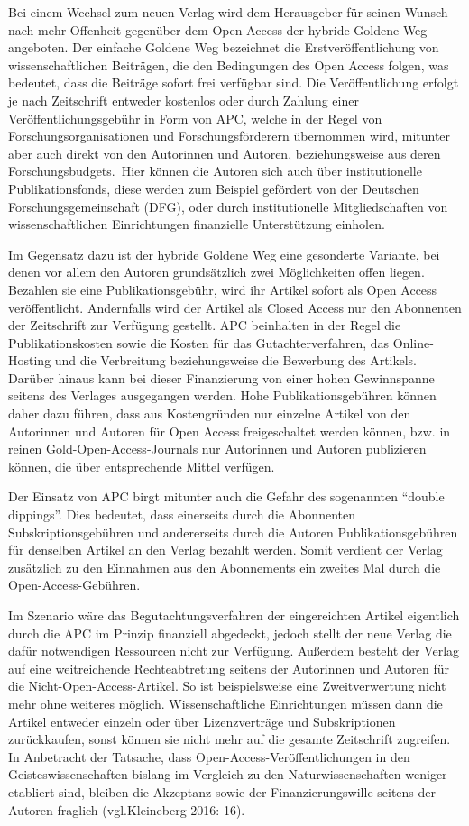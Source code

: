 \documentclass[a4paper,
fontsize=11pt,
oneside,
numbers=noperiodatend,
parskip=half-,
bibliography=totoc,
final
]{scrartcl}
\begin{document}
Bei einem Wechsel zum neuen Verlag wird dem Herausgeber für seinen
Wunsch nach mehr Offenheit gegenüber dem Open Access der hybride Goldene
Weg angeboten. Der einfache Goldene Weg bezeichnet die
Erstveröffentlichung von wissenschaftlichen Beiträgen, die den
Bedingungen des Open Access folgen, was bedeutet, dass die Beiträge
sofort frei verfügbar sind. Die Veröffentlichung erfolgt je nach
Zeitschrift entweder kostenlos oder durch Zahlung einer
Veröffentlichungsgebühr in Form von APC, welche in der Regel von
Forschungsorganisationen und Forschungsförderern übernommen wird,
mitunter aber auch direkt von den Autorinnen und Autoren,
beziehungsweise aus deren Forschungsbudgets.~Hier können die Autoren
sich auch über institutionelle Publikationsfonds, diese werden zum
Beispiel gefördert von der Deutschen Forschungsgemeinschaft (DFG), oder
durch institutionelle Mitgliedschaften von wissenschaftlichen
Einrichtungen finanzielle Unterstützung einholen.

Im Gegensatz dazu ist der hybride Goldene Weg eine gesonderte Variante,
bei denen vor allem den Autoren grundsätzlich zwei Möglichkeiten offen
liegen. Bezahlen sie eine Publikationsgebühr, wird ihr Artikel sofort
als Open Access veröffentlicht. Andernfalls wird der Artikel als Closed
Access nur den Abonnenten der Zeitschrift zur Verfügung gestellt. APC
beinhalten in der Regel die Publikationskosten sowie die Kosten für das
Gutachterverfahren, das Online-Hosting und die Verbreitung
beziehungsweise die Bewerbung des Artikels. Darüber hinaus kann bei
dieser Finanzierung von einer hohen Gewinnspanne seitens des Verlages
ausgegangen werden. Hohe Publikationsgebühren können daher dazu führen,
dass aus Kostengründen nur einzelne Artikel von den Autorinnen und
Autoren für Open Access freigeschaltet werden können, bzw. in reinen
Gold-Open-Access-Journals nur Autorinnen und Autoren publizieren können,
die über entsprechende Mittel verfügen.

Der Einsatz von APC birgt mitunter auch die Gefahr des sogenannten
\enquote{double dippings}. Dies bedeutet, dass einerseits durch die
Abonnenten Subskriptionsgebühren und andererseits durch die Autoren
Publikationsgebühren für denselben Artikel an den Verlag bezahlt werden.
Somit verdient der Verlag zusätzlich zu den Einnahmen aus den
Abonnements ein zweites Mal durch die Open-Access-Gebühren.

Im Szenario wäre das Begutachtungsverfahren der eingereichten Artikel
eigentlich durch die APC im Prinzip finanziell abgedeckt, jedoch stellt
der neue Verlag die dafür notwendigen Ressourcen nicht zur Verfügung.
Außerdem besteht der Verlag auf eine weitreichende Rechteabtretung
seitens der Autorinnen und Autoren für die Nicht-Open-Access-Artikel. So
ist beispielsweise eine Zweitverwertung nicht mehr ohne weiteres
möglich. Wissenschaftliche Einrichtungen müssen dann die Artikel
entweder einzeln oder über Lizenzverträge und Subskriptionen
zurückkaufen, sonst können sie nicht mehr auf die gesamte Zeitschrift
zugreifen. In Anbetracht der Tatsache, dass
Open-Access-Veröffentlichungen in den Geisteswissenschaften bislang im
Vergleich zu den Naturwissenschaften weniger etabliert sind, bleiben die
Akzeptanz sowie der Finanzierungswille seitens der Autoren fraglich
(vgl.Kleineberg 2016: 16).
\end{document}
